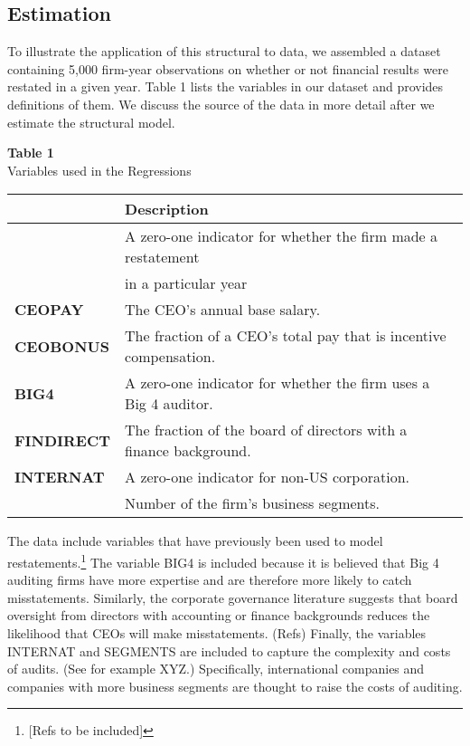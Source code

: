\subsection{Estimation}

To illustrate the application of this structural to data, we assembled a dataset containing 
5,000 firm-year observations on whether or not financial results were restated in a given year.
Table 1 lists the variables in our dataset and provides definitions of them. 
We discuss the source of the data in more detail after we estimate the structural model. 

\begin{table}[t]
\begin{center}
{\bf Table 1} \\
Variables used in the Regressions \\[1em]
\begin{tabular}{|l|l|}
\hline
\T {\bf Variable}  &  {\bf Description}   \\ \hline
\T {\bf RESTATE} & A zero-one indicator for whether the firm made a restatement\\
   & \qquad in a particular year \\[.3em]
{\bf CEOPAY} & The CEO's annual base salary.  \\[.3em]
{\bf CEOBONUS} & The fraction of a CEO's total pay that is incentive compensation.   \\[.3em]
{\bf BIG4} & A zero-one indicator for whether the firm uses a Big 4 auditor. \\[.3em]
{\bf FINDIRECT} & The fraction of the board of directors with a finance background.  \\[.3em]
{\bf INTERNAT} &  A zero-one indicator for non-US corporation.  \\[.3em]
\B {\bf SEGMENTS} & Number of the firm's business segments. \\
\hline
\end{tabular}
\end{center}
\end{table}

\vglue 10pt
The data include variables that have previously been used to model restatements.\footnote{[Refs to be included]} The variable BIG4 is included 
because it is believed that Big 4 auditing firms have more expertise and are therefore more likely
to catch misstatements. Similarly, the corporate governance literature suggests that board oversight 
from directors with accounting or finance backgrounds reduces the likelihood that CEOs will 
make misstatements. (Refs) Finally, the variables INTERNAT and 
SEGMENTS are included to capture the complexity and costs of audits. (See for example
XYZ.) Specifically, international companies and companies with more business segments are 
thought to raise the costs of auditing. 


